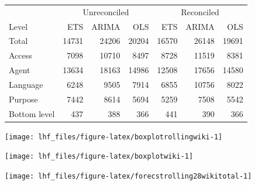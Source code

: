 \documentclass[11pt,a4paper,]{article}
\let\origfigure\figure
\let\endorigfigure\endfigure
\renewenvironment{figure}[1][2] {
    \expandafter\origfigure\expandafter[!htbp]
} {
    \endorigfigure
}
\let\origtable\table
\let\endorigtable\endtable
\renewenvironment{table}[1][2] {
    \expandafter\origtable\expandafter[!htbp]
} {
    \endorigtable
}
\begin{document}
\begin{table}

\caption{\label{tab:wikipediadataresultRMSE}Mean RMSE for ETS, ARIMA and OLS with and without reconciliation - Fixed origin - Wikipedia dataset}
\centering
\begin{tabular}[t]{lrrrrrr}
\toprule
\multicolumn{1}{c}{} & \multicolumn{3}{c}{Unreconciled} & \multicolumn{3}{c}{Reconciled} \\
\cmidrule(l{3pt}r{3pt}){2-4} \cmidrule(l{3pt}r{3pt}){5-7}
Level & ETS & ARIMA & OLS & ETS & ARIMA & OLS\\
\midrule
Total & 14731 & 24206 & 20204 & 16570 & 26148 & 19691\\
Access & 7098 & 10710 & 8497 & 8728 & 11519 & 8381\\
Agent & 13634 & 18163 & 14986 & 12508 & 17656 & 14580\\
Language & 6248 & 9505 & 7914 & 6855 & 10756 & 8022\\
Purpose & 7442 & 8614 & 5694 & 5259 & 7508 & 5542\\
Bottom level & 437 & 388 & 366 & 441 & 390 & 366\\
\bottomrule
\end{tabular}
\end{table}

\begin{figure}

{\centering \texttt{[image: lhf\_files/figure-latex/boxplotrollingwiki-1]} 

}

\caption{Box plots of forecast errors for reconciled and unreconciled ETS, ARIMA and OLS methods at each hierarchy level for rolling origin forecasts of Wikipedia pageviews.}\label{fig:boxplotrollingwiki}
\end{figure}

\begin{figure}

{\centering \texttt{[image: lhf\_files/figure-latex/boxplotwiki-1]} 

}

\caption{Box plots of forecast errors for reconciled and unreconciled ETS, ARIMA and OLS methods at each hierarchy level for fixed origin forecasts of Wikipedia pageviews.}\label{fig:boxplotwiki}
\end{figure}

\begin{figure}

{\centering \texttt{[image: lhf\_files/figure-latex/forecstrolling28wikitotal-1]} 

}

\caption{Comparing reconciled and unreconciled ETS, ARIMA and OLS rolling and fixed origin forecasts for Wikipedia pageviews 'Total' Series.}\label{fig:forecstrolling28wikitotal}
\end{figure}
\end{document}
